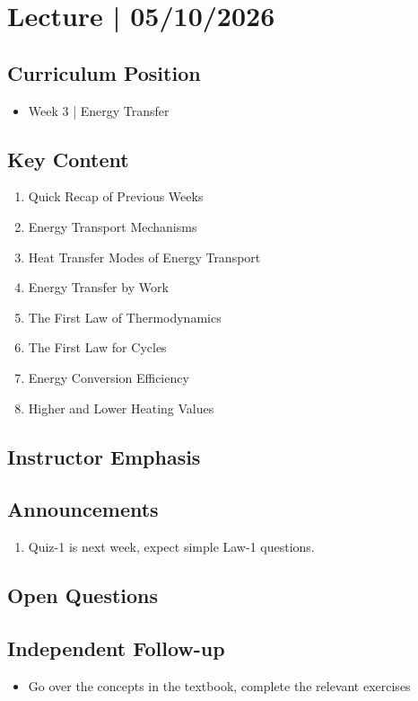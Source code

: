 \section{Lecture | 05/10/2026}


\subsection*{Curriculum Position}
\begin{itemize}
	\item Week 3 | Energy Transfer
\end{itemize}

\subsection*{Key Content}
\begin{enumerate}
	\item Quick Recap of Previous Weeks
    \item Energy Transport Mechanisms
    \item Heat Transfer Modes of Energy Transport
    \item Energy Transfer by Work
    \item The First Law of Thermodynamics
    \item The First Law for Cycles
    \item Energy Conversion Efficiency
    \item Higher and Lower Heating Values

\end{enumerate}

\subsection*{Instructor Emphasis}

\subsection*{Announcements}
\begin{enumerate}
	\item Quiz-1 is next week, expect simple Law-1 questions.
\end{enumerate}


\subsection*{Open Questions}


\subsection*{Independent Follow-up}
\begin{itemize}
	\item Go over the concepts in the textbook, complete the relevant exercises
\end{itemize}


